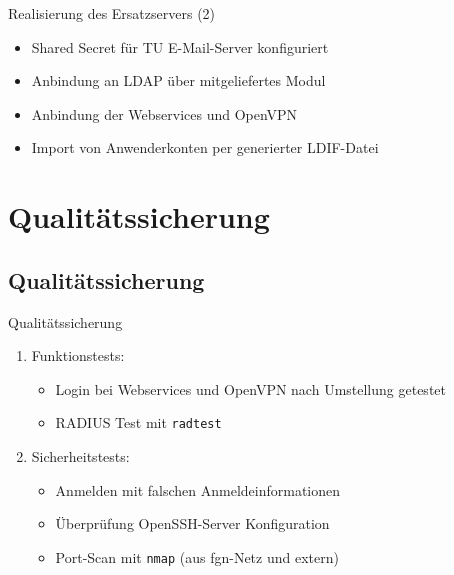 \documentclass[presentation,svgnames,12pt]{beamer}
\begin{document}
\begin{frame}{Realisierung des Ersatzservers (2)}
\begin{itemize}
	\item Shared Secret für TU E-Mail-Server konfiguriert
	\item Anbindung an LDAP über mitgeliefertes Modul
	\item Anbindung der Webservices und OpenVPN
	\item Import von Anwenderkonten per generierter LDIF-Datei
\end{itemize}
\end{frame}


\section{Qualitätssicherung}
\subsection{Qualitätssicherung}
\begin{frame}{Qualitätssicherung}
\begin{enumerate}
	\item Funktionstests:
	\vspace{6pt}
	\begin{itemize}
		\item Login bei Webservices und OpenVPN nach Umstellung getestet
		\item RADIUS Test mit \texttt{radtest}
	\end{itemize}
	\item Sicherheitstests:
	\vspace{6pt}
	\begin{itemize}
		\item Anmelden mit falschen Anmeldeinformationen
		\item Überprüfung OpenSSH-Server Konfiguration
		\item Port-Scan mit \texttt{nmap} (aus fgn-Netz und extern)
	\end{itemize}
\end{enumerate}
\end{frame}
\end{document}
